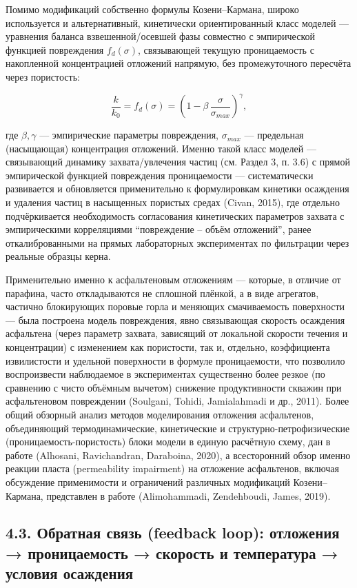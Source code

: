 \documentclass[11pt]{extarticle}
\begin{document}
Помимо модификаций собственно формулы Козени--Кармана, широко используется и альтернативный, кинетически ориентированный класс моделей --- уравнения баланса взвешенной/осевшей фазы совместно с эмпирической функцией повреждения \(f_d(\sigma)\), связывающей текущую проницаемость с накопленной концентрацией отложений напрямую, без промежуточного пересчёта через пористость:

\[
\frac{k}{k_0} = f_d(\sigma) = \left(1 - \beta\,\frac{\sigma}{\sigma_{max}}\right)^{\gamma},
\]

где \(\beta, \gamma\) --- эмпирические параметры повреждения, \(\sigma_{max}\) --- предельная (насыщающая) концентрация отложений. Именно такой класс моделей --- связывающий динамику захвата/увлечения частиц (см. Раздел 3, п. 3.6) с прямой эмпирической функцией повреждения проницаемости --- систематически развивается и обновляется применительно к формулировкам кинетики осаждения и удаления частиц в насыщенных пористых средах (Civan, 2015), где отдельно подчёркивается необходимость согласования кинетических параметров захвата с эмпирическими корреляциями ``повреждение -- объём отложений'', ранее откалиброванными на прямых лабораторных экспериментах по фильтрации через реальные образцы керна.

Применительно именно к асфальтеновым отложениям --- которые, в отличие от парафина, часто откладываются не сплошной плёнкой, а в виде агрегатов, частично блокирующих поровые горла и меняющих смачиваемость поверхности --- была построена модель повреждения, явно связывающая скорость осаждения асфальтена (через параметр захвата, зависящий от локальной скорости течения и концентрации) с изменением как пористости, так и, отдельно, коэффициента извилистости и удельной поверхности в формуле проницаемости, что позволило воспроизвести наблюдаемое в экспериментах существенно более резкое (по сравнению с чисто объёмным вычетом) снижение продуктивности скважин при асфальтеновом повреждении (Soulgani, Tohidi, Jamialahmadi и др., 2011). Более общий обзорный анализ методов моделирования отложения асфальтенов, объединяющий термодинамические, кинетические и структурно-петрофизические (проницаемость-пористость) блоки модели в единую расчётную схему, дан в работе (Alhosani, Ravichandran, Daraboina, 2020), а всесторонний обзор именно реакции пласта (permeability impairment) на отложение асфальтенов, включая обсуждение применимости и ограничений различных модификаций Козени--Кармана, представлен в работе (Alimohammadi, Zendehboudi, James, 2019).

\subsection{4.3. Обратная связь (feedback loop): отложения → проницаемость → скорость и температура → условия осаждения}\label{ux43eux431ux440ux430ux442ux43dux430ux44f-ux441ux432ux44fux437ux44c-feedback-loop-ux43eux442ux43bux43eux436ux435ux43dux438ux44f-ux43fux440ux43eux43dux438ux446ux430ux435ux43cux43eux441ux442ux44c-ux441ux43aux43eux440ux43eux441ux442ux44c-ux438-ux442ux435ux43cux43fux435ux440ux430ux442ux443ux440ux430-ux443ux441ux43bux43eux432ux438ux44f-ux43eux441ux430ux436ux434ux435ux43dux438ux44f}
\end{document}
